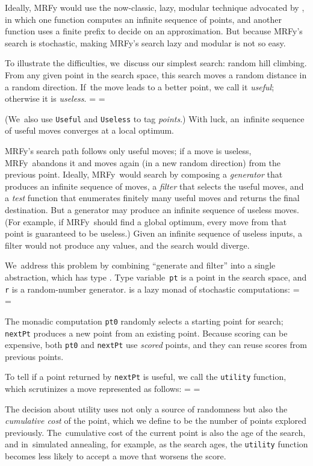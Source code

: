 \documentclass[preprint,nonatbib,blockstyle,times]{sigplanconf}
\newcommand\mrfy{MRFy} %
\newif\ifverbatimsmall
\newcommand\smallverbatiminput[1]{%
  \verbatimsmalltrue
  \presvtopsep=\topsep
  \topsep=0.78\topsep
  \verbatimsmallfalse
  \topsep=\presvtopsep
}
\begin{document}
Ideally, MRFy would use the now-classic, lazy, modular
technique advocated by \citet{hughes:why}, in which one function
computes an infinite sequence of points, and another function
uses a finite prefix to decide on an approximation.
But because MRFy's search is stochastic, 
making MRFy's search lazy and modular is not so easy.

To illustrate the difficulties, we~discuss our simplest search:
random hill climbing.
From any given point in the search space, this search moves a random
distance in a random 
direction.
If~the move leads to a better point, 
we call it \emph{useful};
otherwise it is \emph{useless}.
\smallverbatiminput{utility}
(We~also use \texttt{Useful} and \texttt{Useless} to tag \emph{points}.)
With luck, an~infinite sequence of useful moves converges
at a local optimum.

\mrfy's search path follows only useful moves;
if a move is useless, 
\mrfy\ abandons it and moves again (in a new random direction) from the
previous point.
Ideally, \mrfy\ would search by composing a \emph{generator}
that produces an infinite sequence of moves, 
a \emph{filter} that selects the useful moves, and 
a \emph{test} function that enumerates finitely many useful moves
and returns the final destination.
But a generator may produce an infinite sequence of useless moves.
(For example, if \mrfy\ should find a global optimum, every move from
that point is guaranteed to be useless.)
Given an infinite sequence of useless inputs, a filter would not
produce any values, and the search would diverge.





We~address this problem by combining ``generate and filter'' into a
single abstraction, which has type .
Type variable~\texttt{pt} is a point in the search
space, and \texttt{r} is a
random-number generator.
 is a lazy monad of stochastic computations:
\smallverbatiminput{gen.tex}
The monadic computation \texttt{pt0} randomly selects a starting point
for search;
\texttt{nextPt} produces a new point from
an existing point.
Because scoring can be expensive, both \texttt{pt0}
and \texttt{nextPt} use \emph{scored} points, and they can
reuse scores from previous points.

To tell if a point returned by \texttt{nextPt} is useful, we call
 the \texttt{utility} function,
which scrutinizes a move represented as follows:
\smallverbatiminput{move}
The decision about utility uses not only a source of randomness but
also the \emph{cumulative cost} of the point, which we define to be
the number of points explored previously.
The~cumulative cost of the current point is also the age of the
search,
and
in~simulated annealing, for example, as the search ages,
the \texttt{utility} function becomes less likely to accept a move
that worsens the score.
\end{document}
